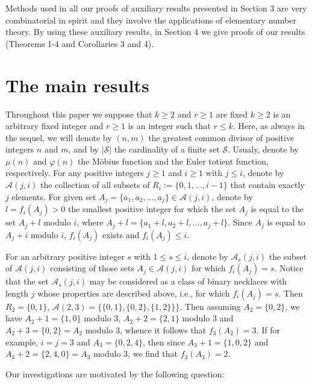 \documentclass[12pt]{amsart}
\begin{document}
{ Methods used in all our proofs of auxiliary results presented in Section 3 
are very 
combinatorial in spirit and they involve the applications of elementary 
number theory. 
By using these auxiliary results, in Section 4 
we give proofs of our results (Theorems 1-4 and Corollaries 3 and 4). 
 
 
\section{The main results}



Throughout this paper we suppose that  
$k\ge 2$ and  $r\ge 1$ are fixed 
 $k\ge 2$ is an arbitrary fixed integer and  $r\ge 1$   
is an integer  such that $r\le k$. 
Here, as always in the sequel, we will denote by $(n,m)$ the greatest common 
divisor  of positive integers $n$ and $m$, and  by $|{\mathcal S}|$ the cardinality of
 a finite set ${\mathcal S}$. Usualy, denote by  $\mu(n)$ and $\varphi(n)$ 
the  M\"{o}bius  function and the Euler totient function, respectively.
For any positive integers   $j\ge 1$ and $i\ge 1$ with $j\le i$,
denote by ${\mathcal A}(j,i)$ the collection  of all subsets of
$R_i:=\{0,1,\ldots,i-1\}$  that contain 
exactly $j$ elements.
For given set $A_j=\{a_1,a_2,\ldots,a_j\}\in {\mathcal A}(j,i)$,
 denote by  $l=f_i (A_j)>0$
the smallest positive integer for which the set 
$A_j$ is equal to the set $A_j+l$ modulo
$i$, where $A_j+l=\{a_1+l,a_2+l,\ldots,a_j+l\}$. Since
$A_j$ is equal to $A_j+i$ modulo $i$, $f_i(A_j)$ exists and  
$f_i (A_j)\le i$.

For an arbitrary positive integer $s$ with $1\le s\le i$, 
denote by ${\mathcal A}_s(j,i)$ the subset of ${\mathcal A}(j,i)$ consisting
of those sets $A_j\in {\mathcal A}(j,i)$ for which $f_i(A_j)=s$.
Notice that the set ${\mathcal A}_s(j,i)$ may be considered 
as a class of binary necklaces  with   length $j$ whose  properties are 
described above, i.e., for which $f_i(A_j)=s$.
Then  $R_2=\{0,1\}$,  ${\mathcal A}(2,3)=\{\{0,1\},\{0,2\},\{1,2\}\}\}$. 
Then assuming $A_2=\{0,2\}$, we have $A_2+1=\{1,0\}$ modulo 3,
$A_2+2=\{2,1\}$ modulo 3 and $A_2+3=\{0,2\}=A_2$ modulo 3,
whence it follows that $f_3 (A_2)=3$. If for example, $i=j=3$ and 
$A_3=\{0,2,4\}$, then since $A_3+1=\{1,0,2\}$ and 
$A_3+2=\{2,4,0\}=A_3$ modulo 3, we find that $f_3 (A_3)=2$.       
 

Our investigations are motivated 
by  the following question:

}
\end{document}
